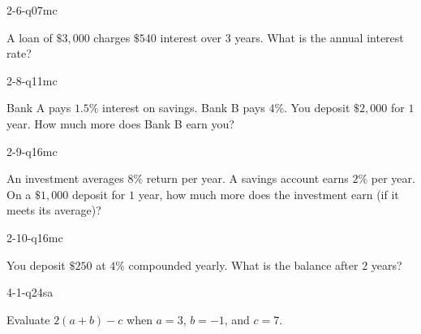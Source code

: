 \documentclass[12pt, fleqn, openany]{studyGuide}
\begin{document}
\begin{practiceQuestion}{2-6-q07}{mc}
\begin{questionText}
A loan of $\$3{,}000$ charges $\$540$ interest over $3$ years. What is the annual interest rate?
\end{questionText}
\end{practiceQuestion}

\begin{practiceQuestion}{2-8-q11}{mc}
\begin{questionText}
Bank A pays $1.5\%$ interest on savings. Bank B pays $4\%$. You deposit $\$2{,}000$ for $1$ year. How much more does Bank B earn you?
\end{questionText}
\end{practiceQuestion}

\begin{practiceQuestion}{2-9-q16}{mc}
\begin{questionText}
An investment averages $8\%$ return per year. A savings account earns $2\%$ per year. On a $\$1{,}000$ deposit for $1$ year, how much more does the investment earn (if it meets its average)?
\end{questionText}
\end{practiceQuestion}

\begin{practiceQuestion}{2-10-q16}{mc}
\begin{questionText}
You deposit $\$250$ at $4\%$ compounded yearly. What is the balance after $2$ years?
\end{questionText}
\end{practiceQuestion}

\begin{practiceQuestion}{4-1-q24}{sa}
\begin{questionText}
Evaluate $2(a + b) - c$ when $a = 3$, $b = -1$, and $c = 7$.
\end{questionText}
\end{practiceQuestion}
\end{document}

